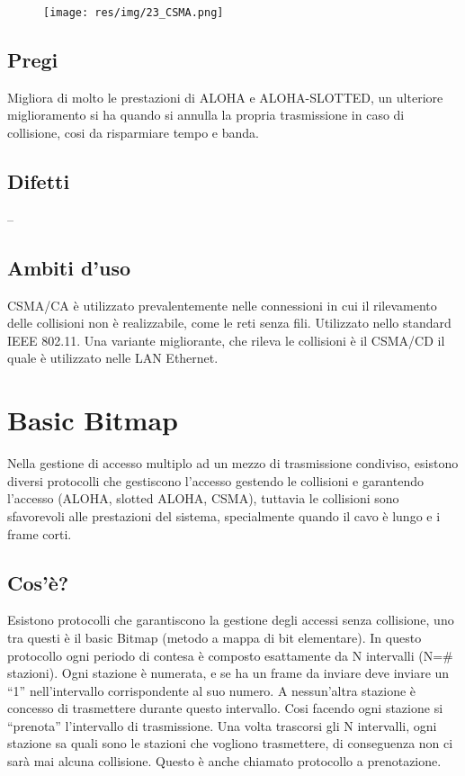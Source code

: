 \begin{figure}[H]
\centering
\texttt{[image: res/img/23\_CSMA.png]}
\end{figure}

\subsection{Pregi}
Migliora di molto le prestazioni di ALOHA e ALOHA-SLOTTED, un ulteriore miglioramento si ha quando si annulla la propria trasmissione in caso di collisione, cosi da risparmiare tempo e banda.

\subsection{Difetti}
--

\subsection{Ambiti d'uso}
CSMA/CA è utilizzato prevalentemente nelle connessioni in cui il rilevamento delle collisioni non è realizzabile, come le reti senza fili.
Utilizzato nello standard IEEE 802.11.
Una variante migliorante, che rileva le collisioni è il CSMA/CD il quale è utilizzato nelle LAN Ethernet.

\section{Basic Bitmap}

Nella gestione di accesso multiplo ad un mezzo di trasmissione condiviso, esistono diversi protocolli che gestiscono l'accesso gestendo le collisioni e garantendo l'accesso (ALOHA, slotted ALOHA, CSMA), tuttavia le collisioni sono sfavorevoli alle prestazioni del sistema, specialmente quando il cavo è lungo e i frame corti.
\subsection{Cos'è?}
Esistono protocolli che garantiscono la gestione degli accessi senza collisione, uno tra questi è il basic Bitmap (metodo a mappa di bit elementare). In questo protocollo ogni periodo di contesa è composto esattamente da N intervalli (N=\# stazioni). Ogni stazione è numerata, e se ha un frame da inviare deve inviare un “1” nell'intervallo corrispondente al suo numero. A nessun'altra stazione è concesso di trasmettere durante questo intervallo. Cosi facendo ogni stazione si “prenota” l'intervallo di trasmissione. Una volta trascorsi gli N intervalli, ogni stazione sa quali sono le stazioni che vogliono trasmettere, di conseguenza non ci sarà mai alcuna collisione.
Questo è anche chiamato protocollo a prenotazione.

